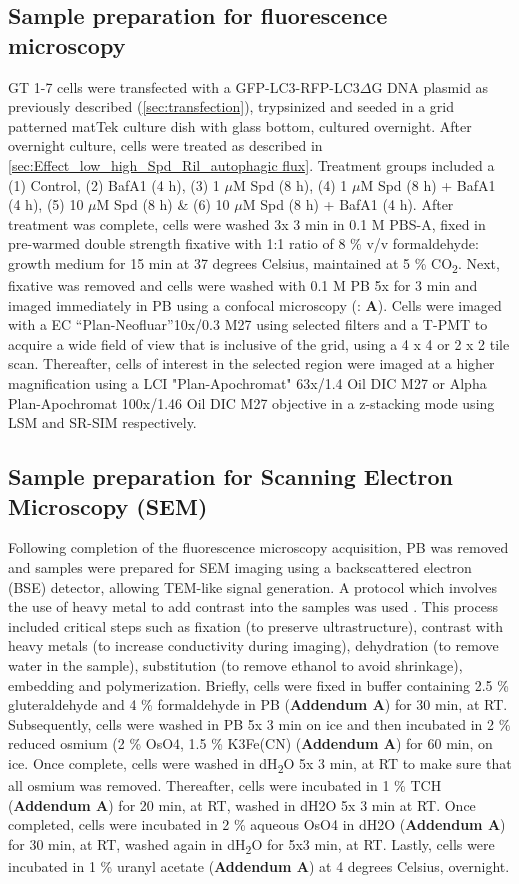 \subsection{Sample preparation for fluorescence microscopy}
GT 1-7 cells were transfected with a GFP-LC3-RFP-LC3$\Delta$G DNA plasmid as previously described (\cref{sec:transfection}), trypsinized and seeded in a grid patterned matTek culture dish with glass bottom, cultured overnight. After overnight culture, cells were treated as described in \cref{sec:Effect_low_high_Spd_Ril_autophagic flux}. Treatment groups included a (1) Control, (2) BafA1 (4 h), (3) 1 $\mu$M Spd (8 h), (4) 1 $\mu$M Spd (8 h) + BafA1 (4 h), (5) 10 $\mu$M Spd (8 h) \& (6) 10 $\mu$M Spd (8 h) + BafA1 (4 h). After treatment was complete, cells were washed 3x 3 min in 0.1 M PBS-A, fixed in pre-warmed double strength fixative with 1:1 ratio of 8 \% v/v formaldehyde: growth medium for 15 min at 37 degrees Celsius, maintained at 5 \% CO\textsubscript{2}. Next, fixative was removed and cells were washed with 0.1 M PB 5x for 3 min and imaged immediately in PB using a confocal microscopy (: \textbf{A}). Cells were imaged with a EC “Plan-Neofluar”10x/0.3 M27 using selected filters and a T-PMT to acquire a wide field of view that is inclusive of the grid, using a 4 x 4 or 2 x 2 tile scan. Thereafter, cells of interest in the selected region were imaged at a higher magnification using a LCI "Plan-Apochromat" 63x/1.4 Oil DIC M27 or Alpha Plan-Apochromat 100x/1.46 Oil DIC M27 objective in a z-stacking mode using LSM and SR-SIM respectively. 

\subsection{Sample preparation for Scanning Electron Microscopy (SEM)}
Following completion of the fluorescence microscopy acquisition, PB was removed and samples were prepared for SEM imaging using a backscattered electron (BSE) detector, allowing TEM-like signal generation. A protocol which involves the use of heavy metal to add contrast into the samples was used \citep{Russell2017}. This process included critical steps such as fixation (to preserve ultrastructure), contrast with heavy metals (to increase conductivity during imaging), dehydration (to remove water in the sample), substitution (to remove ethanol to avoid shrinkage), embedding and polymerization. Briefly, cells were fixed in buffer containing 2.5 \% gluteraldehyde and 4 \% formaldehyde in PB (\textbf{Addendum A}) for 30 min, at RT. Subsequently, cells were washed in PB 5x 3 min on ice and then incubated in 2 \% reduced osmium (2 \% OsO4, 1.5 \% K3Fe(CN) (\textbf{Addendum A}) for 60 min, on ice. Once complete, cells were washed in dH\textsubscript{2}O 5x 3 min, at RT to make sure that all osmium was removed. Thereafter, cells were incubated in 1 \% TCH (\textbf{Addendum A}) for 20 min, at RT, washed in dH2O 5x 3 min at RT. Once completed, cells were incubated in 2 \% aqueous OsO4 in dH2O (\textbf{Addendum A}) for 30 min, at RT, washed again in dH\textsubscript{2}O for 5x3 min, at RT. Lastly, cells were incubated in 1 \% uranyl acetate (\textbf{Addendum A}) at 4 degrees Celsius, overnight.

